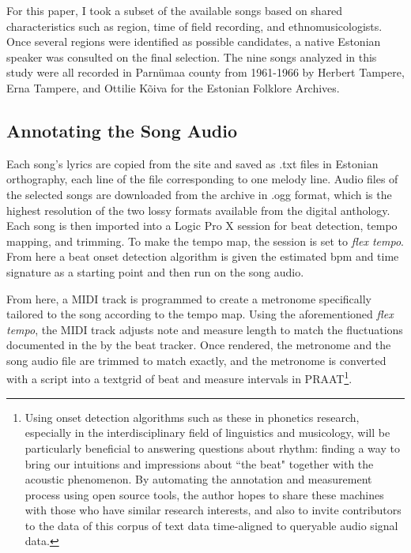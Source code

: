 For this paper, I took a subset of the available songs based on shared characteristics such as region, time of field recording, and ethnomusicologists.  Once several regions were identified as possible candidates, a native Estonian speaker was consulted on the final selection. The nine songs analyzed in this study were all recorded in Parnümaa county from 1961-1966 by Herbert Tampere, Erna Tampere, and Ottilie Kõiva for the Estonian Folklore Archives\citep{oras2002, tampere2016}. 



\subsection{Annotating the Song Audio }

 Each song's lyrics are copied from the site and saved as .txt files in Estonian orthography, each line of the file corresponding to one melody line.  
Audio files of the selected songs are downloaded from the archive in .ogg format, which is the highest resolution of the two lossy formats available from the digital anthology. Each song is then imported into a Logic Pro X \citep{logic2014} session for beat detection, tempo mapping, and trimming. 
To make the tempo map, the session is set to {\it flex tempo}. From here a beat onset detection algorithm is  given the estimated bpm and time signature as a starting point and then run on the song audio. 

From here, a MIDI track is programmed to create a metronome specifically tailored to the song according to the tempo map. Using the aforementioned {\it flex tempo}, the MIDI track adjusts note and measure length to match the fluctuations documented in the by the beat tracker. Once rendered, the metronome and the song audio file are trimmed to match exactly, and the metronome is converted with a script into a textgrid of beat and measure intervals in PRAAT\citep{boersna2022}\footnote{Using onset detection algorithms such as these \citep{bKeeper2007} in phonetics research, especially in the interdisciplinary field of linguistics and musicology, will be particularly beneficial to answering questions about rhythm: finding a way to bring our intuitions and impressions about ``the beat" together with the acoustic phenomenon. By automating the annotation and measurement process using open source tools, the author hopes to share these machines with those who have similar research interests, and also to invite contributors to the data of this corpus of text data time-aligned to queryable audio signal data.}. 

